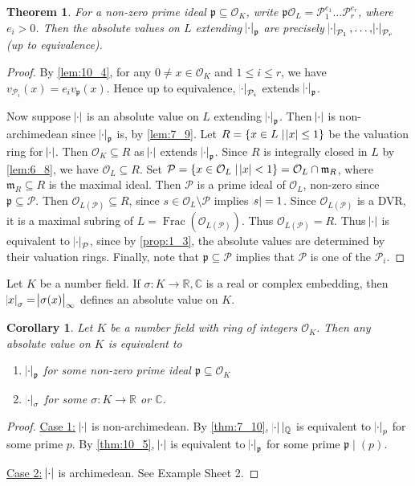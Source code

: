 \documentclass[11pt]{article}
\theoremstyle{definition}
\theoremstyle{plain}
\newtheorem{theorem}[definition]{Theorem}
\newtheorem{corollary}[definition]{Corollary}
\theoremstyle{remark}
\DeclareMathOperator{\Frac}{Frac}
\newcommand{\bQ}{\mathbb{Q}}
\newcommand{\bR}{\mathbb{R}}
\newcommand{\bC}{\mathbb{C}}
\newcommand{\cO}{\mathcal{O}}
\newcommand{\cP}{\mathcal{P}}
\newcommand{\fp}{\mathfrak{p}}
\newcommand{\fm}{\mathfrak{m}}
\begin{document}
\begin{theorem}\label{thm:10_5}
    For a non-zero prime ideal $\fp \subseteq \cO_K$, write $\fp \cO_L = \cP_1^{e_1} \ldots \cP_r^{e_r}$, where $e_i > 0$. Then the absolute values on $L$ extending $\abs{\cdot}_\fp$ are precisely $\abs{\cdot}_{\cP_1}, \ldots, \abs{\cdot}_{\cP_r}$ (up to equivalence).
\end{theorem}
\begin{proof}
    By \autoref{lem:10_4}, for any $0 \neq x \in \cO_K$ and $1 \le i \le r$, we have $v_{\cP_i}(x) = e_i v_\fp(x)$. Hence up to equivalence, $\abs{\cdot}_{\cP_i}$ extends $\abs{\cdot}_\fp$.

    Now suppose $\abs{\cdot}$ is an absolute value on $L$ extending $\abs{\cdot}_\fp$. Then $\abs{\cdot}$ is non-archimedean since $\abs{\cdot}_\fp$ is, by \autoref{lem:7_9}. Let $R = \{x \in L \mid \abs{x} \le 1\}$ be the valuation ring for $\abs{\cdot}$. Then $\cO_K \subseteq R$ as $\abs{\cdot}$ extends $\abs{\cdot}_\fp$. Since $R$ is integrally closed in $L$ by \autoref{lem:6_8}, we have $\cO_L \subseteq R$. Set $\cP = \{x \in \cO_L \mid \abs{x} < 1\} = \cO_L \cap \fm_R$, where $\fm_R \subseteq R$ is the maximal ideal. Then $\cP$ is a prime ideal of $\cO_L$, non-zero since $\fp \subseteq \cP$. Then $\cO_{L(\cP)} \subseteq R$, since $s \in \cO_L \setminus \cP$ implies $\abs{s} = 1$. Since $\cO_{L(\cP)}$ is a DVR, it is a maximal subring of $L = \Frac(\cO_{L(\cP)})$. Thus $\cO_{L(\cP)} = R$. Thus $\abs{\cdot}$ is equivalent to $\abs{\cdot}_\cP$, since by \autoref{prop:1_3}, the absolute values are determined by their valuation rings. Finally, note that $\fp \subseteq \cP$ implies that $\cP$ is one of the $\cP_i$.
\end{proof}

Let $K$ be a number field. If $\sigma : K \to \bR, \bC$ is a real or complex embedding, then $\abs{x}_\sigma = \abs{\sigma(x)}_\infty$ defines an absolute value on $K$.

\begin{corollary}\label{cor:10_6}
    Let $K$ be a number field with ring of integers $\cO_K$. Then any absolute value on $K$ is equivalent to
    \begin{enumerate}
        \item $\abs{\cdot}_\fp$ for some non-zero prime ideal $\fp \subseteq \cO_K$
        \item $\abs{\cdot}_\sigma$ for some $\sigma : K \to \bR$ or $\bC$.
    \end{enumerate}
\end{corollary}
\begin{proof}
    \underline{Case 1:} $\abs{\cdot}$ is non-archimedean. By \autoref{thm:7_10}, $\abs{\cdot} \vert_\bQ$ is equivalent to $\abs{\cdot}_p$ for some prime $p$. By \autoref{thm:10_5}, $\abs{\cdot}$ is equivalent to $\abs{\cdot}_\fp$ for some prime $\fp \mid (p)$.

    \underline{Case 2:} $\abs{\cdot}$ is archimedean. See Example Sheet 2.
\end{proof}
\end{document}

